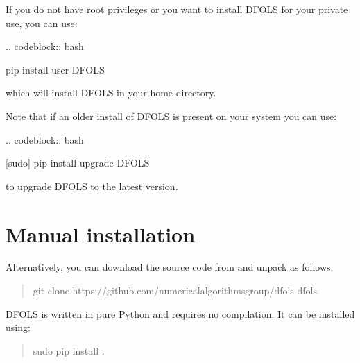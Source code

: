\documentclass[letterpaper,10pt,english]{sphinxmanual}
\begin{document}
If you do not have root privileges or you want to install DFO\sphinxhyphen{}LS for your private use, you can use:

\begin{sphinxVerbatim}[commandchars=\\\{\}]
.. code\PYGZhy{}block:: bash

   \PYGZdl{} pip install \PYGZhy{}\PYGZhy{}user DFO\PYGZhy{}LS
\end{sphinxVerbatim}

which will install DFO\sphinxhyphen{}LS in your home directory.

Note that if an older install of DFO\sphinxhyphen{}LS is present on your system you can use:

\begin{sphinxVerbatim}[commandchars=\\\{\}]
.. code\PYGZhy{}block:: bash

   \PYGZdl{} [sudo] pip install \PYGZhy{}\PYGZhy{}upgrade DFO\PYGZhy{}LS
\end{sphinxVerbatim}

to upgrade DFO\sphinxhyphen{}LS to the latest version.


\section{Manual installation}
\label{\detokenize{install:manual-installation}}
Alternatively, you can download the source code from  and unpack as follows:
\begin{quote}

\begin{sphinxVerbatim}[commandchars=\\\{\}]
\PYGZdl{} git clone https://github.com/numericalalgorithmsgroup/dfols
\PYGZdl{}  dfols
\end{sphinxVerbatim}
\end{quote}

DFO\sphinxhyphen{}LS is written in pure Python and requires no compilation. It can be installed using:
\begin{quote}

\begin{sphinxVerbatim}[commandchars=\\\{\}]
\PYGZdl{} \PYG{o}{[}sudo\PYG{o}{]} pip install .
\end{sphinxVerbatim}
\end{quote}
\end{document}
